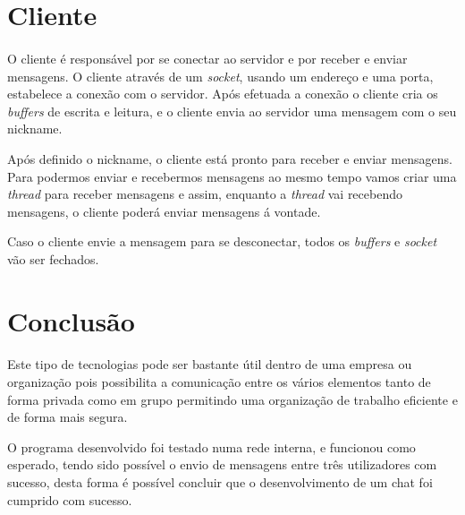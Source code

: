 \documentclass{article}
\begin{document}
\section{Cliente}
\paragraph{}
O cliente é responsável por se conectar ao servidor e por receber e enviar mensagens.
 O cliente através de um \emph{socket}, usando um endereço e uma porta, estabelece a conexão com o servidor. Após efetuada a conexão o cliente cria os \emph{buffers} de escrita e leitura, e o cliente envia ao servidor uma mensagem com o seu nickname.
 
Após definido o nickname, o cliente está pronto para receber e enviar mensagens. Para podermos enviar e recebermos mensagens ao mesmo tempo vamos criar uma \emph{thread} para receber mensagens e assim, enquanto a \emph{thread} vai recebendo mensagens, o cliente poderá enviar mensagens á vontade.

Caso o cliente envie a mensagem para se desconectar, todos os \emph{buffers} e \emph{socket} vão ser fechados.

\section{Conclusão}
\paragraph{}
Este tipo de tecnologias pode ser bastante útil dentro de uma empresa ou organização pois possibilita a comunicação entre os vários elementos tanto de forma privada como em grupo permitindo uma organização de trabalho eficiente e de forma mais segura.

O programa desenvolvido foi testado numa rede interna, e funcionou como esperado, tendo sido possível o envio de mensagens entre três utilizadores com sucesso, desta forma é possível concluir que o desenvolvimento de um chat foi cumprido com sucesso.
\nocite{gfg}
\nocite{aulas}


\end{document}
